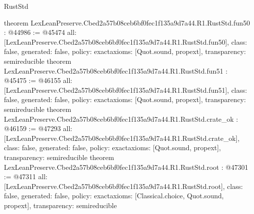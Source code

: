 \begin{lexlean}{RustStd}
\begin{coremodule}
{}
theorem LexLeanPreserve.Cbed2a57b08ceb6bf0fec1f135a9d7a44.R1.RustStd.fun50 : @44986 := @45474 {
  all: [LexLeanPreserve.Cbed2a57b08ceb6bf0fec1f135a9d7a44.R1.RustStd.fun50],
  class: false,
  generated: false,
  policy: exact{axioms: [Quot.sound, propext]},
  transparency: semireducible
}
theorem LexLeanPreserve.Cbed2a57b08ceb6bf0fec1f135a9d7a44.R1.RustStd.fun51 : @45475 := @46155 {
  all: [LexLeanPreserve.Cbed2a57b08ceb6bf0fec1f135a9d7a44.R1.RustStd.fun51],
  class: false,
  generated: false,
  policy: exact{axioms: [Quot.sound, propext]},
  transparency: semireducible
}
theorem LexLeanPreserve.Cbed2a57b08ceb6bf0fec1f135a9d7a44.R1.RustStd.crate_ok : @46159 := @47293 {
  all: [LexLeanPreserve.Cbed2a57b08ceb6bf0fec1f135a9d7a44.R1.RustStd.crate_ok],
  class: false,
  generated: false,
  policy: exact{axioms: [Quot.sound, propext]},
  transparency: semireducible
}
theorem LexLeanPreserve.Cbed2a57b08ceb6bf0fec1f135a9d7a44.R1.RustStd.root : @47301 := @47311 {
  all: [LexLeanPreserve.Cbed2a57b08ceb6bf0fec1f135a9d7a44.R1.RustStd.root],
  class: false,
  generated: false,
  policy: exact{axioms: [Classical.choice, Quot.sound, propext]},
  transparency: semireducible
}


\end{coremodule}
\end{lexlean}
